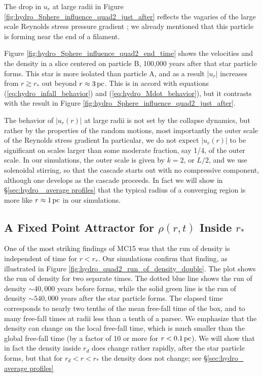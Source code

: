 \documentclass[../dissertation.tex]{subfiles}
\begin{document}
The drop in $u_r$ at large radii in Figure 
\ref{fig:hydro_Sphere_influence_quad2_just_after} reflects the vagaries 
of the large scale Reynolds stress pressure gradient%
; we already mentioned that this particle is forming near the end of a filament.

Figure \ref{fig:hydro_Sphere_influence_quad2_end_time} shows the velocities and the density in a slice centered on particle B, 100,000 years after that star particle forms. 
This star is more isolated than particle A, and as a result $|u_r|$
increases from $r\gtrsim r_*$ out beyond $r\approx 3\,\rm pc$. This is in
accord with equations (\ref{eq:hydro_infall_behavior}) and (\ref{eq:hydro_Mdot_behavior}), but
it contrasts with the result in Figure \ref{fig:hydro_Sphere_influence_quad2_just_after}. 

The behavior of $|u_r(r)|$ at large radii is not set by the collapse dynamics, but rather by
the properties of the random motions, %
 most importantly the outer scale of the Reynolds stress gradient%
In particular, we do not expect $|u_r(r)|$ to be significant on scales larger than some moderate 
fraction, say 1/4, of the outer scale. In our simulations, the outer scale is given by $k=2$, 
or $L/2$, and we use solenoidal stirring, so that the cascade starts out with no compressive
component, although one develops as the cascade proceeds. In fact 
we will show in \S \ref{sec:hydro_ average profiles} that the typical radius of a converging region 
is more like $r\approx 1\,\rm pc$ in our simulations.

\subsection{A Fixed Point Attractor for $\rho(r, t)$ Inside $r_*$}\label{sec:hydro_attractor}

One of the most striking findings of MC15 was that the run of density is 
independent of time for $r<r_*$. Our simulations confirm that finding, 
as illustrated in Figure \ref{fig:hydro_quad2_run_of_density_double}.
The plot shows the run of density for two separate times.
The dotted blue line shows the run of density $\sim 40,000$ years 
before \partA forms, while the solid green line is the run of 
density $\sim 540,000$ years after the star particle forms.
The elapsed time corresponds to nearly two tenths of the mean free-fall 
time of the box, and to many free-fall times at radii less than a tenth of a parsec.
We emphasize that the density can change on the local free-fall time, which is much smaller than the global free-fall time (by a factor of 10 or more for $r<0.1\,\rm pc$). We will show that in fact the density inside $r_d$ does change rather rapidly, after the star particle forms, but that for $r_d<r<r_*$ the density does not change; see \S \ref{sec:hydro_ average profiles}
\end{document}
